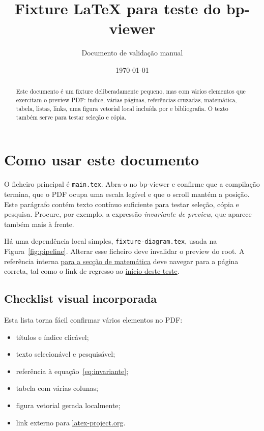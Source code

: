 \documentclass[11pt,a4paper]{article}
\title{Fixture LaTeX para teste do bp-viewer}
\author{Documento de validação manual}
\date{\today}
\begin{document}
\maketitle
\begin{abstract}
Este documento é um fixture deliberadamente pequeno, mas com vários elementos
que exercitam o preview PDF: índice, várias páginas, referências cruzadas,
matemática, tabela, listas, links, uma figura vetorial local incluída por
\verb|| e bibliografia. O texto também serve para testar seleção e cópia.
\end{abstract}

\tableofcontents
\newpage

\section{Como usar este documento}
\label{sec:como-usar}

O ficheiro principal é \texttt{main.tex}. Abra-o no bp-viewer e confirme que a
compilação termina, que o PDF ocupa uma escala legível e que o scroll mantém a
posição. Este parágrafo contém texto contínuo suficiente para testar seleção,
cópia e pesquisa. Procure, por exemplo, a expressão \emph{invariante de
preview}, que aparece também mais à frente.

Há uma dependência local simples, \texttt{fixture-diagram.tex}, usada na
Figura~\ref{fig:pipeline}. Alterar esse ficheiro deve invalidar o preview do
root. A referência interna \hyperref[sec:matematica]{para a secção de
matemática} deve navegar para a página correta, tal como o link de regresso ao
\hyperref[sec:como-usar]{início deste teste}.

\subsection{Checklist visual incorporada}
\label{subsec:checklist}
Esta lista torna fácil confirmar vários elementos no PDF:
\begin{itemize}
  \item títulos e índice clicável;
  \item texto selecionável e pesquisável;
  \item referência à equação~\eqref{eq:invariante};
  \item tabela com várias colunas;
  \item figura vetorial gerada localmente;
  \item link externo para \href{https://www.latex-project.org/}{latex-project.org}.
\end{itemize}
\end{document}
